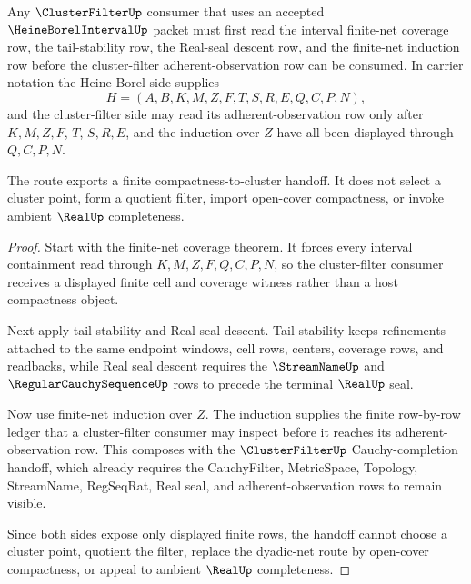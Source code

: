 \begin{theorem}
\label{thm:heine-borel-interval-cluster-filter-route}
Any $\ClusterFilterUp$ consumer that uses an accepted $\HeineBorelIntervalUp$ packet must first read the interval finite-net coverage row, the tail-stability row, the Real-seal descent row, and the finite-net induction row before the cluster-filter adherent-observation row can be consumed. In carrier notation the Heine-Borel side supplies
$$
H=(A,B,K,M,Z,F,T,S,R,E,Q,C,P,N),
$$
and the cluster-filter side may read its adherent-observation row only after $K,M,Z,F$, $T$, $S,R,E$, and the induction over $Z$ have all been displayed through $Q,C,P,N$.

The route exports a finite compactness-to-cluster handoff. It does not select a cluster point, form a quotient filter, import open-cover compactness, or invoke ambient $\RealUp$ completeness.
\end{theorem}
\begin{proof}
Start with the finite-net coverage theorem. It forces every interval containment read through $K,M,Z,F,Q,C,P,N$, so the cluster-filter consumer receives a displayed finite cell and coverage witness rather than a host compactness object.

Next apply tail stability and Real seal descent. Tail stability keeps refinements attached to the same endpoint windows, cell rows, centers, coverage rows, and readbacks, while Real seal descent requires the $\StreamNameUp$ and $\RegularCauchySequenceUp$ rows to precede the terminal $\RealUp$ seal.

Now use finite-net induction over $Z$. The induction supplies the finite row-by-row ledger that a cluster-filter consumer may inspect before it reaches its adherent-observation row. This composes with the $\ClusterFilterUp$ Cauchy-completion handoff, which already requires the CauchyFilter, MetricSpace, Topology, StreamName, RegSeqRat, Real seal, and adherent-observation rows to remain visible.

Since both sides expose only displayed finite rows, the handoff cannot choose a cluster point, quotient the filter, replace the dyadic-net route by open-cover compactness, or appeal to ambient $\RealUp$ completeness.
\end{proof}

